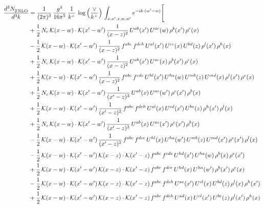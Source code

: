 \documentclass[9pt]{article}
\numberwithin{equation}{section}
\begin{document}
\begin{align}
 \frac{d^{3}N_{2\,\rm NLO}^{\rm}}{d^{3}k}  & = \frac{1}{(2\pi)^{3}}\,\frac{g^{4}}{16\pi^{5}}\,\frac{1}{k^{+}}\,\log{\left(\frac{\vee}{k^{+}}\right)}\, \int_{x,x',z,w,w'}e^{-ik\cdot(w'-w)}\Bigg[\notag\\ & 
+\frac{1}{2}\,N_{c}\,\mathcal{K}(x-w)\cdot\mathcal{K}(x'-w')\,\frac{1}{(x-z)^{2}}\,U^{ab}(x')\,U^{ac}(w)\,\rho^{b}(x')\,\rho^{c}(x)\notag \\ 
&-\frac{1}{2}\,\mathcal{K}(x-w)\cdot\mathcal{K}(x'-w')\,\frac{1}{(x-z)^{2}}\,f^{abc}\,f^{deh}\,U^{al}(x')\,U^{ce}(x)\,U^{bd}(z)\,\rho^{l}(x')\,\rho^{h}(x)\notag \\ 
&+\frac{1}{2}\,N_{c}\,\mathcal{K}(x-w)\cdot\mathcal{K}(x'-w')\,\frac{1}{(x-z)^{2}}\,U^{ab}(x')\,U^{ac}(x)\,\rho^{b}(x')\,\rho^{c}(x)\notag \\ 
&+\frac{1}{2}\,\mathcal{K}(x-w)\cdot\mathcal{K}(x'-w')\,\frac{1}{(x-z)^{2}}\,f^{abc}\,f^{cde}\,U^{hl}(x')\,U^{ha}(w)\,U^{mb}(z)\,U^{md}(x)\,\rho^{l}(x')\,\rho^{e}(x)\notag \\ 
&+\frac{1}{2}\,N_{c}\,\mathcal{K}(x-w)\cdot\mathcal{K}(x'-w')\,\frac{1}{(x'-z)^{2}}\,U^{ab}(x)\,U^{ac}(w')\,\rho^{c}(x')\,\rho^{b}(x)\notag \\ 
&+\frac{1}{2}\,\mathcal{K}(x-w)\cdot\mathcal{K}(x'-w')\,\frac{1}{(x'-z)^{2}}\,f^{abc}\,f^{deh}\,U^{al}(x)\,U^{cd}(x')\,U^{be}(z)\,\rho^{h}(x')\,\rho^{l}(x)\notag \\ 
&+\frac{1}{2}\,N_{c}\,\mathcal{K}(x-w)\cdot\mathcal{K}(x'-w')\,\frac{1}{(x'-z)^{2}}\,U^{ab}(x)\,U^{ac}(x')\,\rho^{c}(x')\,\rho^{b}(x)\notag \\ 
&-\frac{1}{2}\,\mathcal{K}(x-w)\cdot\mathcal{K}(x'-w')\,\frac{1}{(x'-z)^{2}}\,f^{abc}\,f^{dce}\,U^{hl}(x)\,U^{ha}(w')\,U^{mb}(z)\,U^{md}(x')\,\rho^{e}(x')\,\rho^{l}(x)\notag \\ 
&-\frac{1}{2}\,\mathcal{K}(x-w)\cdot\mathcal{K}(x'-w')\,\mathcal{K}(x-z)\cdot\mathcal{K}(x'-z)\,f^{abc}\,f^{cde}\,U^{hd}(x')\,U^{ha}(w)\,\rho^{b}(x)\,\rho^{e}(x')\notag \\ 
&+\frac{1}{2}\,\mathcal{K}(x-w)\cdot\mathcal{K}(x'-w')\,\mathcal{K}(x-z)\cdot\mathcal{K}(x'-z)\,f^{abc}\,f^{dce}\,U^{hd}(x)\,U^{ha}(w')\,\rho^{b}(x')\,\rho^{e}(x)\notag \\ 
&-\frac{1}{2}\,\mathcal{K}(x-w)\cdot\mathcal{K}(x'-w')\,\mathcal{K}(x-z)\cdot\mathcal{K}(x'-z)\,f^{abc}\,f^{deh}\,U^{ae}(x')\,U^{cl}(x)\,U^{bd}(z)\,\rho^{l}(x)\,\rho^{h}(x')\notag \\ 
&+\frac{1}{2}\,\mathcal{K}(x-w)\cdot\mathcal{K}(x'-w')\,\mathcal{K}(x-z)\cdot\mathcal{K}(x'-z)\,f^{abc}\,f^{deh}\,U^{ad}(x)\,U^{cl}(x')\,U^{be}(z)\,\rho^{l}(x')\,\rho^{h}(x)\notag \\ 

\end{align}
\end{document}
